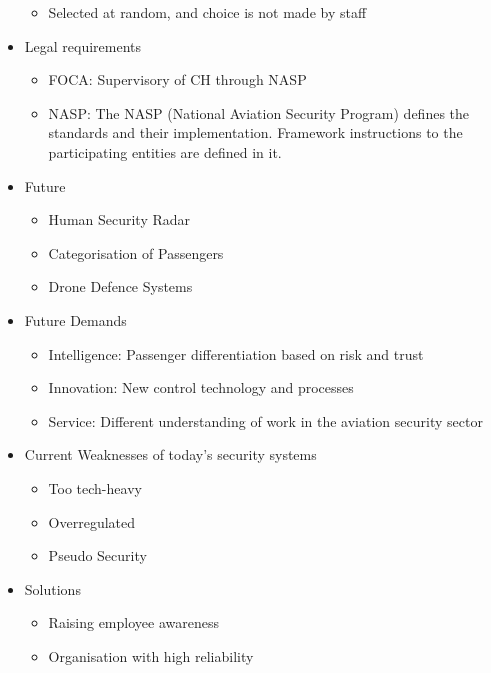 \documentclass[9pt, landscape, fleqn]{scrartcl}
\begin{document}
\begin{multicols*}{3}
\begin{itemize}
    \begin{itemize}
        \item Selected at random, and choice is not made by staff 
    \end{itemize}
    \item Legal requirements 
    \begin{itemize}
        \item FOCA: Supervisory of CH through NASP 
        \item NASP: The NASP (National Aviation Security Program) defines the standards and their implementation. Framework instructions to the participating entities are defined in it.
    \end{itemize}
    \item Future 
    \begin{itemize}
        \item Human Security Radar 
        \item Categorisation of Passengers 
        \item Drone Defence Systems 
    \end{itemize}
    \item Future Demands 
    \begin{itemize}
        \item Intelligence: Passenger differentiation based on risk and trust 
        \item Innovation: New control technology and processes
        \item Service: Different understanding of work in the aviation security sector
    \end{itemize}
    \item Current Weaknesses of today's security systems 
    \begin{itemize}
        \item Too tech-heavy 
        \item Overregulated 
        \item Pseudo Security 
    \end{itemize}
    \item Solutions 
    \begin{itemize}
        \item Raising employee awareness 
        \item Organisation with high reliability
    \end{itemize}
\end{itemize}
\end{multicols*}
\end{document}
